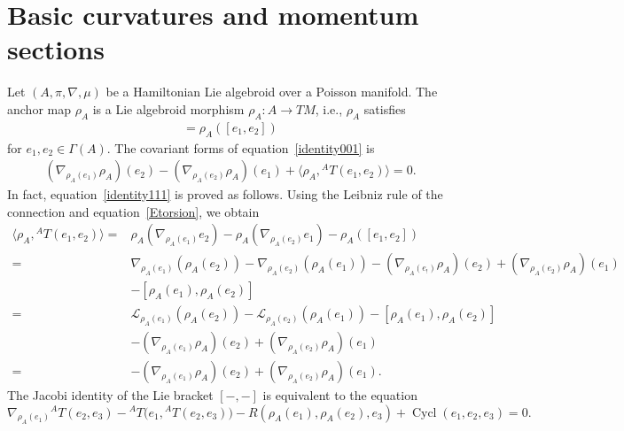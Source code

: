 \documentclass[10pt,a4paper]{amsart}
\numberwithin{equation}{section}
\newcommand{\calL}{{\mathcal L}}
\newcommand{\rhoa}{{\rho_A}}
\begin{document}
\section{Basic curvatures and momentum sections}\label{sec3}
Let $(A, \pi, \nabla,\mu)$ be a Hamiltonian Lie algebroid over a Poisson manifold.
The anchor map $\rhoa$ is a Lie algebroid morphism $\rhoa\colon A \rightarrow TM$,
i.e., $\rhoa$ satisfies
\begin{gather}
 [\rhoa(e_1), \rhoa(e_2)] = \rhoa([e_1, e_2])
\label{identity001}
\end{gather}
for $e_1, e_2 \in \Gamma(A)$.
The covariant forms of equation~\eqref{identity001}
is
\begin{gather}
(\nabla_{\rhoa(e_1)} \rhoa)(e_2) - (\nabla_{\rhoa(e_2)} \rhoa)(e_1)
+ \bigl\langle\rhoa,{}^A T(e_1, e_2)\bigr\rangle= 0.
\label{identity111}
\end{gather}
In fact, equation~\eqref{identity111} is proved as follows.
Using the Leibniz rule of the connection and equation~\eqref{Etorsion}, we obtain
\begin{align*}
\bigl\langle\rhoa,{}^A T(e_1, e_2)\bigr\rangle ={}&
\rhoa (\nabla_{\rhoa(e_1)} e_2) - \rhoa (\nabla_{\rhoa(e_2)} e_1)
- \rhoa([e_1, e_2])
 \\
={}&
\nabla_{\rhoa(e_1)} (\rhoa(e_2)) - \nabla_{\rhoa(e_2)} (\rhoa (e_1))
- (\nabla_{\rhoa(e_!)} \rhoa)(e_2) + (\nabla_{\rhoa(e_2)} \rhoa) ( e_1)
 \\ &
- [\rhoa(e_1), \rhoa(e_2)]
 \\
={}&
\calL_{\rhoa(e_1)} (\rhoa(e_2)) - \calL_{\rhoa(e_2)} (\rhoa (e_1))
- [\rhoa(e_1), \rhoa(e_2)]
 \\ &
- (\nabla_{\rhoa(e_1)} \rhoa)(e_2) + (\nabla_{\rhoa(e_2)} \rhoa) ( e_1)
 \\
={}&
- (\nabla_{\rhoa(e_1)} \rhoa)(e_2) + (\nabla_{\rhoa(e_2)} \rhoa) ( e_1).
\end{align*}
The Jacobi identity of the Lie bracket $[-,-]$ is equivalent to the equation
\[%
\nabla_{\rhoa(e_1)} {}^A T(e_2, e_3) - {}^A T\bigl(e_1, {}^A T(e_2, e_3)\bigr)
- R(\rhoa(e_1), \rhoa(e_2), e_3) + \operatorname{Cycl}(e_1, e_2, e_3)
= 0.
\]
\end{document}
